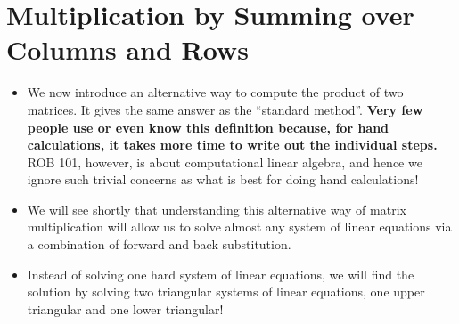 \section{Multiplication by Summing over Columns and Rows}
\label{sec:NovelMatrixMultiplication}

\begin{tcolorbox}[sharp corners, colback=green!30, colframe=green!80!blue, title=\textbf{\large Rock your World: an Alternative Formula for Matrix Multiplication}]

\begin{itemize}
    \item We now introduce an alternative way to compute the product of two matrices. It gives the same answer as the ``standard method''.  \textbf{Very few people use or even know this definition because, for hand calculations, it takes more time to write out the individual steps.} ROB 101, however, is about computational linear algebra, and hence we ignore such trivial concerns as what is best for doing hand calculations! 
    
    \item We will see shortly that understanding this alternative way of matrix multiplication will allow us to solve almost any system of linear equations via a combination of forward and back substitution.

\item Instead of solving one hard system of linear equations, we will find the solution by solving two triangular systems of linear equations, one upper triangular and one lower triangular!
\end{itemize}
\end{tcolorbox}
\vspace*{.2cm}


